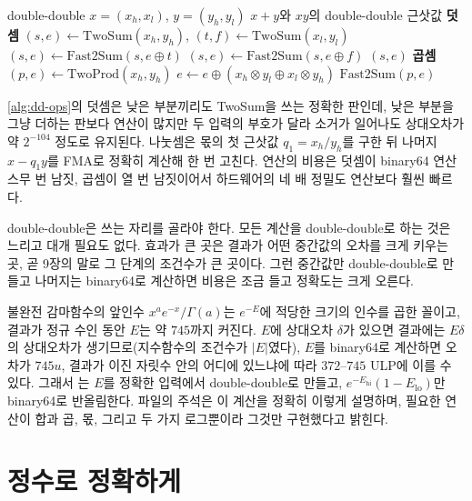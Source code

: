 \begin{algorithm}[t]
\begin{algorithmic}[1]
\Require double-double $x=(x_h,x_l)$, $y=(y_h,y_l)$
\Ensure $x+y$와 $xy$의 double-double 근삿값
\Statex \textbf{덧셈}
\State $(s,e)\gets\mathrm{TwoSum}(x_h,y_h)$, $(t,f)\gets\mathrm{TwoSum}(x_l,y_l)$
\State $(s,e)\gets\mathrm{Fast2Sum}(s,e\oplus t)$
\State $(s,e)\gets\mathrm{Fast2Sum}(s,e\oplus f)$
\State \Return $(s,e)$
\Statex \textbf{곱셈}
\State $(p,e)\gets\mathrm{TwoProd}(x_h,y_h)$
\State $e\gets e\oplus(x_h\otimes y_l\oplus x_l\otimes y_h)$
\State \Return $\mathrm{Fast2Sum}(p,e)$
\end{algorithmic}
\caption{double-double의 덧셈과 곱셈}
\label{alg:dd-ops}
\end{algorithm}

\cref{alg:dd-ops}의 덧셈은 낮은 부분끼리도 TwoSum을 쓰는 정확한 판인데, 낮은 부분을 그냥 더하는 판보다 연산이 많지만 두 입력의 부호가 달라 소거가 일어나도 상대오차가 약 $2^{-104}$ 정도로 유지된다\cite{hida2001qd}. 나눗셈은 몫의 첫 근삿값 $q_1=x_h/y_h$를 구한 뒤 나머지 $x-q_1y$를 FMA로 정확히 계산해 한 번 고친다. 연산의 비용은 덧셈이 binary64 연산 스무 번 남짓, 곱셈이 열 번 남짓이어서 하드웨어의 네 배 정밀도 연산보다 훨씬 빠르다.

double-double은 쓰는 자리를 골라야 한다. 모든 계산을 double-double로 하는 것은 느리고 대개 필요도 없다. 효과가 큰 곳은 결과가 어떤 중간값의 오차를 크게 키우는 곳, 곧 9장의 말로 그 단계의 조건수가 큰 곳이다. 그런 중간값만 double-double로 만들고 나머지는 binary64로 계산하면 비용은 조금 들고 정확도는 크게 오른다.

\begin{instardust}
불완전 감마함수의 앞인수 $x^ae^{-x}/\Gamma(a)$는 $e^{-E}$에 적당한 크기의 인수를 곱한 꼴이고, 결과가 정규 수인 동안 $E$는 약 $745$까지 커진다. $E$에 상대오차 $\delta$가 있으면 결과에는 $E\delta$의 상대오차가 생기므로(지수함수의 조건수가 $|E|$였다), $E$를 binary64로 계산하면 오차가 $745u$, 결과가 이진 자릿수 안의 어디에 있느냐에 따라 $372$--$745$ ULP에 이를 수 있다. 그래서 는 $E$를 정확한 입력에서 double-double로 만들고, $e^{-E_{\mathrm{hi}}}(1-E_{\mathrm{lo}})$만 binary64로 반올림한다. 파일의 주석은 이 계산을 정확히 이렇게 설명하며, 필요한 연산이 합과 곱, 몫, 그리고 두 가지 로그뿐이라 그것만 구현했다고 밝힌다.
\end{instardust}

\section{정수로 정확하게}
\label{sec:integer-accumulation}

